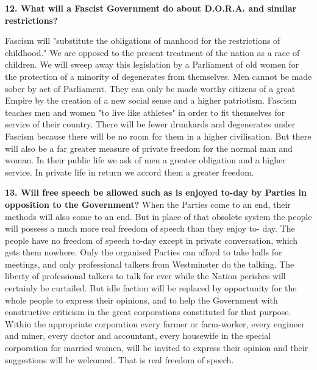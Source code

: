 \documentclass{book}
\begin{document}
\begin{flushleft}
\textbf{12. What will a Fascist Government do about D.O.R.A. and similar restrictions?}

Fascism will "substitute the obligations of manhood for the restrictions of childhood." We are
opposed to the present treatment of the nation as a race of children. We will sweep away this
legislation by a Parliament of old women for the protection of a minority of degenerates from
themselves. Men cannot be made sober by act of Parliament. They can only be made worthy
citizens of a great Empire by the creation of a new social sense and a higher patriotism. Fascism
teaches men and women "to live like athletes" in order to fit themselves for service of their
country. There will be fewer drunkards and degenerates under Fascism because there will be no
room for them in a higher civilisation. But there will also be a far greater measure of private
freedom for the normal man and woman. In their public life we ask of men a greater obligation and a higher service. In private life in return
we accord them a greater freedom.
\end{flushleft}
\begin{flushright}
\textbf{13. Will free speech be allowed such as is enjoyed to-day
    by Parties in opposition to the Government?}
When the Parties come to an end, their methods will also come to an end. But in place of that
obsolete system the people will possess a much more real freedom of speech than they enjoy to-
day. The people have no freedom of speech to-day except in private conversation, which gets
them nowhere. Only the organised Parties can afford to take halls for meetings, and only
professional talkers from Westminster do the talking. The liberty of professional talkers to talk
for ever while the Nation perishes will certainly be curtailed. But idle faction will be replaced by
opportunity for the whole people to express their opinions, and to help the Government with
constructive criticism in the great corporations constituted for that purpose. Within the
appropriate corporation every farmer or farm-worker, every engineer and miner, every doctor
and accountant, every housewife in the special corporation for married women, will be invited to
express their opinion and their suggestions will be welcomed. That is real freedom of speech.
\end{flushright}
\end{document}
